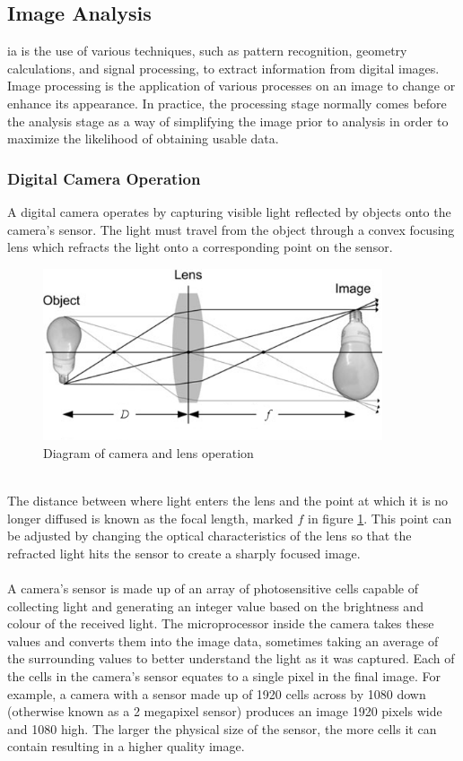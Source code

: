 \subsection{Image Analysis}
	\gls{ia} is the use of various techniques, such as pattern recognition, geometry calculations, and signal processing, to extract information from digital images. Image processing is the application of various processes on an image to change or enhance its appearance. In practice, the processing stage normally comes before the analysis stage as a way of simplifying the image prior to analysis in order to maximize the likelihood of obtaining usable data.
	\subsubsection{Digital Camera Operation}
		A digital camera operates by capturing visible light reflected by objects onto the camera’s sensor. The light must travel from the object through a convex focusing lens which refracts the light onto a corresponding point on the sensor.
		\begin{figure}[h!]
			\centering
			\includegraphics[width=10cm]{../images/camera_bulb.PNG}
			\caption{Diagram of camera and lens operation \citep{introtoprocessing}}
			\label{fig:camera_diagram}
		\end{figure}
		\\
		The distance between where light enters the lens and the point at which it is no longer diffused is known as the focal length, marked $f$ in figure \ref{fig:camera_diagram}. This point can be adjusted by changing the optical characteristics of the lens so that the refracted light hits the sensor to create a sharply focused image.
		\\\\
		A camera’s sensor is made up of an array of photosensitive cells capable of collecting light and generating an integer value based on the brightness and colour of the received light. The microprocessor inside the camera takes these values and converts them into the image data, sometimes taking an average of the surrounding values to better understand the light as it was captured. Each of the cells in the camera’s sensor equates to a single pixel in the final image. For example, a camera with a sensor made up of 1920 cells across by 1080 down (otherwise known as a 2 megapixel sensor) produces an image 1920 pixels wide and 1080 high. The larger the physical size of the sensor, the more cells it can contain resulting in a higher quality image.
